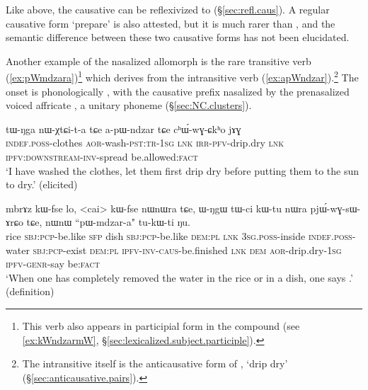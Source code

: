 Like  above, the causative  can be reflexivized to  (§\ref{sec:refl.caus}).  A regular causative form  `prepare' is also attested, but it is much rarer than , and the semantic difference between these two causative forms has not been elucidated.

Another example of the nasalized  allomorph is the rare transitive verb   (\ref{ex:pWmdzara})\footnote{This verb also appears in participial form in the compound  (see \ref{ex:kWndzarmW}, §\ref{sec:lexicalized.subject.participle}). } which derives from the intransitive verb   (\ref{ex:apWndzar}).\footnote{The intransitive  itself is the anticausative form of , `drip dry' (§\ref{sec:anticausative.pairs}). } The onset  is phonologically , with the causative  prefix nasalized by the prenasalized voiced affricate , a unitary phoneme (§\ref{sec:NC.clusters}).

\begin{exe}
\ex \label{ex:apWndzar}
\gll  tɯ-ŋga nɯ-χtɕi-t-a tɕe a-pɯ-ndzar tɕe cʰɯ́-wɣ-ɕkʰo jɤɣ \\
\textsc{indef}.\textsc{poss}-clothes \textsc{aor}-wash-\textsc{pst}:\textsc{tr}-\textsc{1sg} \textsc{lnk} \textsc{irr}-\textsc{pfv}-drip.dry \textsc{lnk} \textsc{ipfv}:\textsc{downstream}-\textsc{inv}-spread be.allowed:\textsc{fact} \\
\glt `I have washed the clothes, let them first drip dry before putting them to the sun to dry.' (elicited)
\end{exe}
 
\begin{exe}
\ex \label{ex:pWmdzara}
\gll mbrɤz kɯ-fse lo, <cai> kɯ-fse nɯnɯra tɕe, ɯ-ŋgɯ tɯ-ci kɯ-tu nɯra pjɯ́-wɣ-sɯ-ɤrɕo tɕe, nɯnɯ ``pɯ-mdzar-a" tu-kɯ-ti ŋu. \\
rice \textsc{sbj}:\textsc{pcp}-be.like \textsc{sfp} dish  \textsc{sbj}:\textsc{pcp}-be.like  \textsc{dem}:\textsc{pl} \textsc{lnk}  \textsc{3sg}.\textsc{poss}-inside \textsc{indef}.\textsc{poss}-water \textsc{sbj}:\textsc{pcp}-exist \textsc{dem}:\textsc{pl} \textsc{ipfv}-\textsc{inv}-\textsc{caus}-be.finished \textsc{lnk} \textsc{dem} \textsc{aor}-drip.dry-\textsc{1sg} \textsc{ipfv}-\textsc{genr}-say be:\textsc{fact} \\
\glt `When one has completely removed the water in the rice or in a dish, one says .' (definition)
\end{exe} 
 
